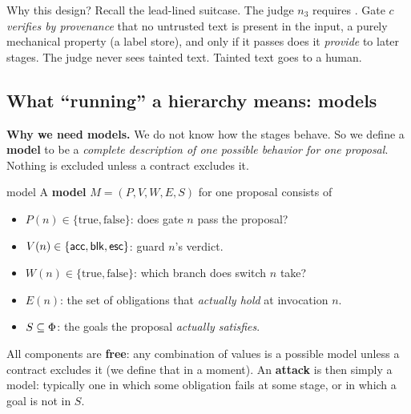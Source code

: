 Why this design? Recall the lead-lined suitcase. The judge $n_3$ requires . Gate $c$ \emph{verifies by provenance} that no untrusted text is present in the input, a purely mechanical property (a label store), and only if it passes does it \emph{provide}  to later stages. The judge never sees tainted text. Tainted text goes to a human.


\subsection{What ``running'' a hierarchy means: models}

\textbf{Why we need models.} We do not know how the stages behave. So we define a \textbf{model} to be a \emph{complete description of one possible behavior for one proposal}. Nothing is excluded unless a contract excludes it.

\begin{defbox}{model}
A \textbf{model} $M=(P,V,W,E,S)$ for one proposal consists of
\begin{itemize}
\item $P(n)\in\{\text{true},\text{false}\}$: does gate $n$ pass the proposal?
\item $V(n)\in\{\mathsf{acc},\mathsf{blk},\mathsf{esc}\}$: guard $n$'s verdict.
\item $W(n)\in\{\text{true},\text{false}\}$: which branch does switch $n$ take?
\item $E(n)$: the set of obligations that \emph{actually hold} at invocation $n$.
\item $S\subseteq\Phi$: the goals the proposal \emph{actually satisfies}.
\end{itemize}
\end{defbox}

All components are \textbf{free}: any combination of values is a possible model unless a contract excludes it (we define that in a moment). An \textbf{attack} is then simply a model: typically one in which some obligation fails at some stage, or in which a goal is not in $S$.


